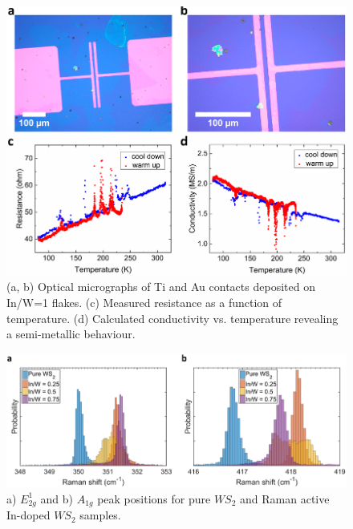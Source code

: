 \begin{figure}[!h]
	\begin{center}
		\includegraphics[scale=0.4]{In/ElectricalMeasurements.png}
		\caption{(a, b) Optical micrographs of Ti and Au contacts deposited on In/W=1 flakes. (c) Measured resistance as a function of temperature. (d) Calculated conductivity vs. temperature revealing a semi-metallic behaviour.}
		\label{fig:InElectricalMeasurement}
	\end{center}
\end{figure}

\newpage
\begin{figure}[!h]
	\begin{center}
		\includegraphics[scale=0.5]{In/RamanPositionHistogram.png}
		\caption{a) $E^1_{2g}$ and b) $A_{1g}$ peak positions for pure $WS_2$ and Raman active In-doped $WS_2$ samples.}
		\label{fig:InRamanPLHistogram}
	\end{center}
\end{figure}

